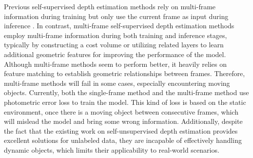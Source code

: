 \documentclass[journal]{IEEEtran}
\begin{document}
Previous self-supervised depth estimation methods rely on multi-frame information during training but only use the current frame as input during inference \cite{godard2017unsupervised, monodepth2, guizilini20203d, shu2020feature, zhou2017unsupervised, yin2018geonet}. In contrast, multi-frame self-supervised depth estimation methods employ multi-frame information during both training and inference stages, typically by constructing a cost volume \cite{ke2021deep, manydepth, feng2022disentangling, guizilini2022multi, sun2018pwc, long2021multi, wimbauer2021monorec, teed2018deepv2d} or utilizing related layers \cite{hur2020self} to learn additional geometric features for improving the performance of the model. Although multi-frame methods seem to perform better, it heavily relies on feature matching to establish geometric relationships between frames. Therefore, multi-frame methods will fail in some cases, especially encountering moving objects. Currently, both the single-frame method and the multi-frame method use photometric error loss to train the model. This kind of loss is based on the static environment, once there is a moving object between consecutive frames, which will mislead the model and bring some wrong information. Additionally, despite the fact that the existing work on self-unsupervised depth estimation \cite{manydepth,wimbauer2021monorec,guizilini2022multi,guizilini2022learning, meng2021cornet} provides excellent solutions for unlabeled data, they are incapable of effectively handling dynamic objects, which limits their applicability to real-world scenarios.
\end{document}
